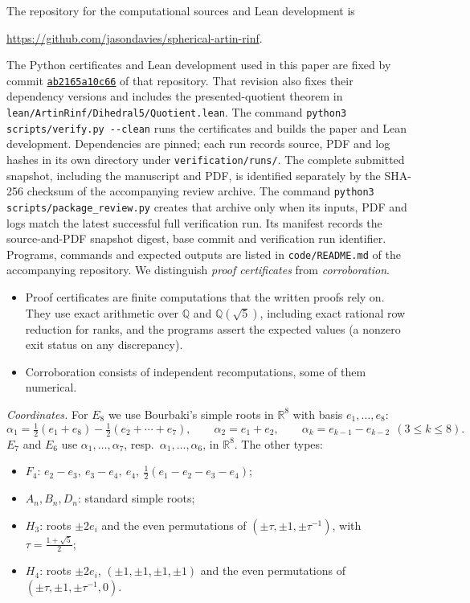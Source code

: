 \documentclass[11pt]{article}
\theoremstyle{definition}
\newcommand{\Q}{\mathbb{Q}}
\begin{document}
The repository for the computational sources and Lean development is
\begin{center}
\url{https://github.com/jasondavies/spherical-artin-rinf}.
\end{center}
The Python certificates and Lean development used in this paper are fixed by commit
\href{https://github.com/jasondavies/spherical-artin-rinf/tree/ab2165a10c66a49f462a1543857f98ae69007f87}{\texttt{ab2165a10c66}}
of that repository.
That revision also fixes their dependency versions and includes
the presented-quotient theorem in \texttt{lean/ArtinRinf/Dihedral5/Quotient.lean}.
The command \texttt{python3 scripts/verify.py -{}-clean} runs the certificates and builds the paper
and Lean development. Dependencies are pinned; each run records source, PDF and log hashes in its own
directory under \texttt{verification/runs/}.
The complete submitted snapshot, including the manuscript and PDF, is identified separately by
the SHA-256 checksum of the accompanying review archive. The command
\texttt{python3 scripts/package\_review.py} creates that archive only when its inputs, PDF and logs
match the latest successful full verification run. Its manifest records the source-and-PDF snapshot
digest, base commit and verification run identifier.
Programs, commands and expected outputs are listed in \texttt{code/README.md} of the accompanying repository. We
distinguish \emph{proof certificates} from \emph{corroboration}.
\begin{itemize}
\item Proof certificates are finite computations that the written proofs rely on. They use exact arithmetic over
$\Q$ and $\Q(\sqrt5)$, including exact rational row reduction for ranks, and the programs assert the expected values
(a nonzero exit status on any discrepancy).
\item Corroboration consists of independent recomputations, some of them numerical.
\end{itemize}

\emph{Coordinates.} For $E_8$ we use Bourbaki's simple roots in $\mathbb R^8$ with basis $e_1,\dots,e_8$:
\[\alpha_1=\tfrac12(e_1+e_8)-\tfrac12(e_2+\cdots+e_7),\qquad\alpha_2=e_1+e_2,\qquad\alpha_k=e_{k-1}-e_{k-2}\ \ (3\le k\le8).\]
$E_7$ and $E_6$ use $\alpha_1,\dots,\alpha_7$, resp.\ $\alpha_1,\dots,\alpha_6$, in $\mathbb R^8$. The other types:
\begin{itemize}
\item $F_4$: $e_2-e_3,\ e_3-e_4,\ e_4,\ \frac12(e_1-e_2-e_3-e_4)$;
\item $A_n,B_n,D_n$: standard simple roots;
\item $H_3$: roots $\pm2e_i$ and the even permutations of $(\pm\tau,\pm1,\pm\tau^{-1})$, with $\tau=\frac{1+\sqrt5}2$;
\item $H_4$: roots $\pm2e_i$, $(\pm1,\pm1,\pm1,\pm1)$ and the even permutations of $(\pm\tau,\pm1,\pm\tau^{-1},0)$.
\end{itemize}
\end{document}
